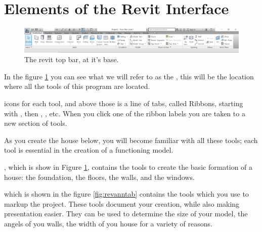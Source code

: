\documentclass{tufte-book} %
\begin{document}
\clearpage
\section{Elements of the Revit Interface}

\begin{figure}
	\includegraphics[width=\linewidth]{revittopbar.png}
	\caption{The revit top bar, at it's base.}
	\label{fig:revtopbar.png}
\end{figure}

In the figure \ref{fig:revtopbar.png} you can see what we will refer to as the , this will be the location where all the tools of this program are located.

 
 icons for each tool, and above those is a line of tabs, called Ribbons, starting with , then , , etc. When you click one of the ribbon labels you are taken to a new section of tools. 

As you create the house below, you will become familiar with all these tools; each tool is essential in the creation of a functioning model.

, which is show in Figure \ref{fig:revtopbar.png}, contains the tools to create the basic formation of a house: the foundation, the floors, the walls, and the windows.


 which is shown in the figure \ref{fig:revanntab} contains the tools which you use to markup the project. These tools document your creation, while also making presentation easier. They can be used to determine the size of your model, the angels of you walls, the width of you house for a variety of reasons.
\end{document}
